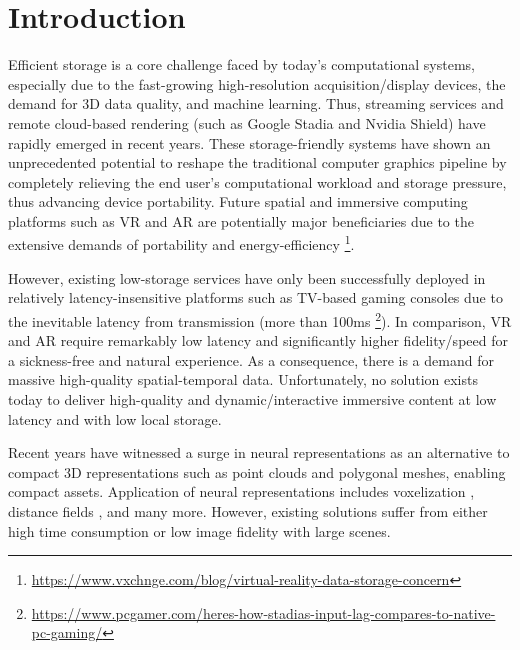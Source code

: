 \section{Introduction}

Efficient storage is a core challenge faced by today's computational systems, especially due to the fast-growing high-resolution acquisition/display devices, the demand for 3D data quality, and machine learning.
Thus, streaming services and remote cloud-based rendering (such as Google Stadia and Nvidia Shield) have rapidly emerged in recent years. These storage-friendly systems have shown an unprecedented potential to reshape the traditional computer graphics pipeline by completely relieving the end user's computational workload and storage pressure, thus advancing device portability. Future spatial and immersive computing platforms such as VR and AR are potentially major beneficiaries due to the extensive demands of portability and energy-efficiency  \footnote{\url{https://www.vxchnge.com/blog/virtual-reality-data-storage-concern}}.

However, existing low-storage services have only been successfully deployed in relatively latency-insensitive platforms such as TV-based gaming consoles due to the inevitable latency from transmission (more than 100ms \footnote{\url{https://www.pcgamer.com/heres-how-stadias-input-lag-compares-to-native-pc-gaming/}}). 
In comparison, VR and AR require remarkably low latency and significantly higher fidelity/speed for a sickness-free and natural experience. As a consequence, there is a demand for massive high-quality spatial-temporal data. Unfortunately, no solution exists today to deliver high-quality and dynamic/interactive immersive content at low latency and with low local storage.


Recent years have witnessed a surge in neural representations as an alternative to compact 3D representations such as point clouds and polygonal meshes, enabling compact assets. Application of neural representations includes voxelization \cite{sitzmann2019deepvoxels}, distance fields \cite{sitzmann2019metasdf,mildenhall2020nerf,park2019deepsdf}, and many more. However, existing solutions suffer from either high time consumption or low image fidelity with large scenes. 

